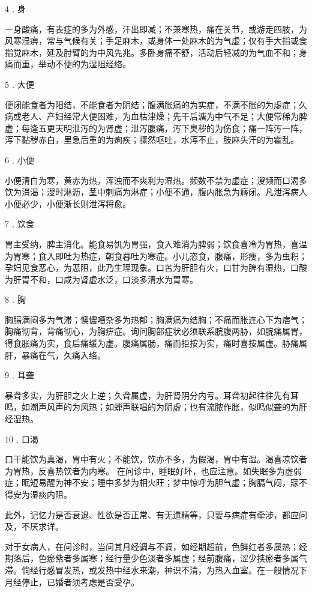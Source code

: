 \documentclass[12pt,UTF8]{ctexbook}
\begin{document}
4﹒身

一身酸痛，有表症的多为外感，汗出即减；不兼寒热，痛在关节，或游走四肢，为风寒湿痹，常与气候有关；手足麻木，或身体一处麻木的为气虚；仅有手大指或食指觉麻木，延及肘臂的为中风先兆。多卧身痛不舒，活动后轻减的为气血不和；身痛而重，举动不便的为湿阻经络。

5﹒大便

便闭能食者为阳结，不能食者为阴结；腹满胀痛的为实症，不满不胀的为虚症；久病或老人、产妇经常大便困难，为血枯津燥；先干后溏为中气不足；大便常稀为脾虚；每逢五更天明泄泻的为肾虚；泄泻腹痛，泻下臭秽的为伤食；痛一阵泻一阵，泻下黏秽赤白，里急后重的为痢疾；骤然呕吐，水泻不止，肢麻头汗的为霍乱。

6﹒小便

小便清白为寒，黄赤为热，浑浊而不爽利为湿热。频数不禁为虚症；溲频而口渴多饮为消渴；溲时淋沥，茎中刺痛为淋症；小便不通，腹内胀急为癃闭。凡泄泻病人小便必少，小便渐长则泄泻将愈。

7﹒饮食

胃主受纳，脾主消化。能食易饥为胃强，食入难消为脾弱；饮食喜冷为胃热，喜温为胃寒；食入即吐为热症，朝食暮吐为寒症。小儿恣食，腹痛，形瘦，多为虫积；孕妇见食恶心，为恶阻，此乃生理现象。口苦为肝胆有火，口甘为脾有湿热，口酸为肝胃不和，口咸为肾虚水泛，口淡多清水为胃寒。

8﹒胸

胸膈满闷多为气滞；懊憹嘈杂多为热郁；胸满痛为结胸；不痛而胀连心下为痞气；胸痛彻背，背痛彻心，为胸痹症。询问胸部症状必须联系脘腹两胁，如脘痛属胃，得食胀痛为实，食后痛缓为虚。腹痛属肠，痛而拒按为实，痛时喜按属虚。胁痛属肝，暴痛在气，久痛入络。

9﹒耳聋

暴聋多实，为肝胆之火上逆；久聋属虚，为肝肾阴分内亏。耳聋初起往往先有耳鸣，如潮声风声的为风热；如蝉声联唱的为阴虚；也有流脓作胀，似鸣似聋的为肝经湿热。

10﹒口渴

口干能饮为真渴，胃中有火；不能饮，饮亦不多，为假渴，胃中有湿。渴喜凉饮者为胃热，反喜热饮者为内寒。
在问诊中，睡眠好坏，也应注意。如失眠多为虚弱症；眠短易醒为神不安；睡中多梦为相火旺；梦中惊呼为胆气虚；胸膈气闷，寐不得安为湿痰内阻。

此外，记忆力是否衰退、性欲是否正常、有无遗精等，只要与病症有牵涉，都应问及，不厌求详。

对于女病人，在问诊时，当问其月经调与不调，如经期超前，色鲜红者多属热；经期落后，色瘀紫者多属寒；经行量少色淡者多属虚；经前腹痛，涩少挟瘀者多属气滞。倘经行感冒发热，或发热中经水来潮，神识不清，为热入血室。在一般情况下月经停止，已婚者须考虑是否受孕。
\end{document}
